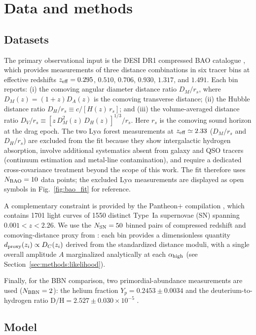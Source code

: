 ﻿\documentclass[3p,twocolumn]{elsarticle}
\begin{document}
\section{Data and methods}\label{sec:methods}

\subsection{Datasets}

The primary observational input is the DESI DR1 compressed BAO catalogue \cite{adame2025desi}, which provides measurements of three distance combinations in six tracer bins at effective redshifts $z_{\rm eff}=0.295$, $0.510$, $0.706$, $0.930$, $1.317$, and $1.491$. Each bin reports: (i) the comoving angular diameter distance ratio $D_M/r_s$, where $D_M(z)=(1+z)D_A(z)$ is the comoving transverse distance; (ii) the Hubble distance ratio $D_H/r_s \equiv c/[H(z)\,r_s]$; and (iii) the volume-averaged distance ratio $D_V/r_s \equiv [z\,D_M^2(z)\,D_H(z)]^{1/3}/r_s$. Here $r_s$ is the comoving sound horizon at the drag epoch. The two Ly$\alpha$ forest measurements at $z_{\rm eff}\simeq2.33$ ($D_M/r_s$ and $D_H/r_s$) are excluded from the fit because they show intergalactic hydrogen absorption, involve additional systematics absent from galaxy and QSO tracers (continuum estimation and metal-line contamination), and require a dedicated cross-covariance treatment beyond the scope of this work. The fit therefore uses $N_{\rm BAO}=10$ data points; the excluded Ly$\alpha$ measurements are displayed as open symbols in Fig.~\ref{fig:bao_fit} for reference.

A complementary constraint is provided by the Pantheon$+$ compilation \cite{scolnic2022pantheon}, which contains 1701 light curves of 1550 distinct Type~Ia supernovae (SN) spanning $0.001<z<2.26$. We use the $N_{\rm SN}=50$ binned pairs of compressed redshift and comoving-distance proxy from \cite{Brout_2022}: each bin provides a dimensionless quantity $d_{\rm proxy}(z_i)\propto D_C(z_i)$ derived from the standardized distance moduli, with a single overall amplitude $A$ marginalized analytically at each $\alpha_{\rm high}$ (see Section~\ref{sec:methods:likelihood}). 

Finally, for the BBN comparison, two primordial-abundance measurements are used ($N_{\rm BBN}=2$): the helium fraction $Y_p=0.2453\pm0.0034$ \cite{Aver2021} and the deuterium-to-hydrogen ratio $\mathrm{D/H}=2.527\pm0.030\times10^{-5}$ \cite{schoneberg2024bbn}.

\subsection{Model}
\end{document}
